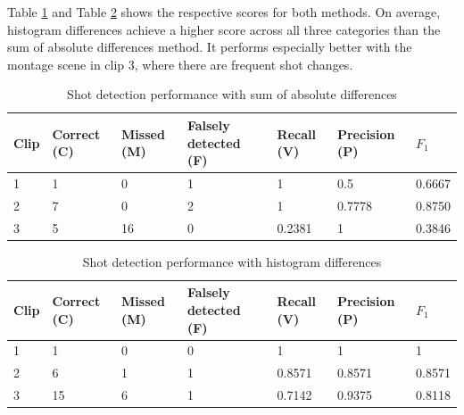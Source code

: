 \documentclass{article}
\begin{document}
Table \ref{tab:sad_results} and Table \ref{tab:hd_results} shows the respective scores for both methods. On average, histogram differences achieve a higher score across all three categories than the sum of absolute differences method. It performs especially better with the montage scene in clip 3, where there are frequent shot changes. 

 \begin{table}[h]
 \caption{Shot detection performance with sum of absolute differences}
  \centering
  \begin{tabular}{lllllll}
    \toprule
    Clip		& Correct (C)	& Missed (M)	& Falsely detected (F) 	& Recall (V) 		& Precision (P) 	& $F_1$ \\
    \midrule
    1			& 	1					& 0					& 1 									& 1					& 0.5					& 0.6667 \\
    2			& 	7					& 0					& 2 									& 1					& 0.7778				& 0.8750 \\
    3			& 	5					& 16					& 0 									& 0.2381			& 1						& 0.3846	\\
    \bottomrule
  \end{tabular}
  \label{tab:sad_results}
\end{table}

\begin{table}[h]
 \caption{Shot detection performance with histogram differences}
  \centering
  \begin{tabular}{lllllll}
    \toprule
    Clip		& Correct (C)	& Missed (M)	& Falsely detected (F) 	& Recall (V) 		& Precision (P) 	& $F_1$ \\
    \midrule
    1			& 	1					& 0					& 0 									& 1					& 1						& 1	\\
    2			& 	6					& 1					& 1 									& 0.8571			& 0.8571				& 0.8571	\\
    3			& 	15				& 6					& 1 									& 0.7142			& 0.9375				& 0.8118	\\
    \bottomrule
  \end{tabular}
  \label{tab:hd_results}
\end{table}
\end{document}
